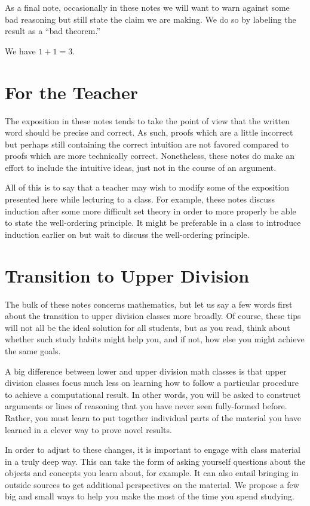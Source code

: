\documentclass[../notes.tex]{subfiles}
\begin{document}
As a final note, occasionally in these notes we will want to warn against some bad reasoning but still state the claim we are making. We do so by labeling the result as a ``bad theorem.''
\begin{badtheorem}
    We have $1+1=3$.
\end{badtheorem}

\section{For the Teacher}
The exposition in these notes tends to take the point of view that the written word should be precise and correct. As such, proofs which are a little incorrect but perhaps still containing the correct intuition are not favored compared to proofs which are more technically correct. Nonetheless, these notes do make an effort to include the intuitive ideas, just not in the course of an argument.

All of this is to say that a teacher may wish to modify some of the exposition presented here while lecturing to a class. For example, these notes discuss induction after some more difficult set theory in order to more properly be able to state the well-ordering principle. It might be preferable in a class to introduce induction earlier on but wait to discuss the well-ordering principle.

\section{Transition to Upper Division}
The bulk of these notes concerns mathematics, but let us say a few words first about the transition to upper division classes more broadly. Of course, these tips will not all be the ideal solution for all students, but as you read, think about whether such study habits might help you, and if not, how else you might achieve the same goals.

A big difference between lower and upper division math classes is that upper division classes focus much less on learning how to follow a particular procedure to achieve a computational result. In other words, you will be asked to construct arguments or lines of reasoning that you have never seen fully-formed before. Rather, you must learn to put together individual parts of the material you have learned in a clever way to prove novel results.

In order to adjust to these changes, it is important to engage with class material in a truly deep way. This can take the form of asking yourself questions about the objects and concepts you learn about, for example. It can also entail bringing in outside sources to get additional perspectives on the material. We propose a few big and small ways to help you make the most of the time you spend studying.
\end{document}
